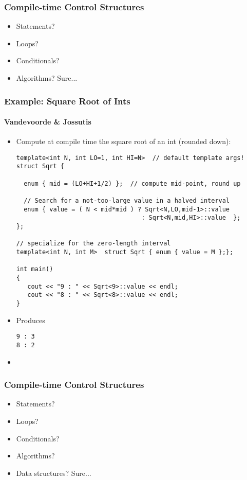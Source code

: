 \newcommand{\ccheck}{{\textcolor{magenta}{\checkmark}}}

\begin{frame}[fragile,t]
\frametitle{Compile-time Control Structures}
\begin{itemize}[<+->]

\item Statements? \ccheck
\item Loops? \ccheck
\item Conditionals? \ccheck
\item Algorithms?  Sure...
\end{itemize}
\end{frame}



\begin{frame}[fragile,t]
\frametitle{Example: Square Root of Ints}
\framesubtitle{Vandevoorde \& Jossutis}
\begin{itemize}[<+->]
\item Compute at compile time the square root of an int (rounded down):
{\scriptsize\begin{verbatim}
template<int N, int LO=1, int HI=N>  // default template args!
struct Sqrt {

  enum { mid = (LO+HI+1/2) };  // compute mid-point, round up

  // Search for a not-too-large value in a halved interval
  enum { value = ( N < mid*mid ) ? Sqrt<N,LO,mid-1>::value
                                  : Sqrt<N,mid,HI>::value  };
};

// specialize for the zero-length interval
template<int N, int M>  struct Sqrt { enum { value = M };};

int main()
{
   cout << "9 : " << Sqrt<9>::value << endl;
   cout << "8 : " << Sqrt<8>::value << endl;
}
\end{verbatim}
}
\item Produces
{\scriptsize\begin{verbatim}
9 : 3
8 : 2
\end{verbatim}
} 
\item {}
\end{itemize}
\end{frame}

\begin{frame}[fragile,t]
\frametitle{Compile-time Control Structures}
\begin{itemize}[<+->]

\item Statements? \ccheck
\item Loops? \ccheck
\item Conditionals? \ccheck
\item Algorithms?  \ccheck
\item Data structures?  Sure...
\end{itemize}
\end{frame}


